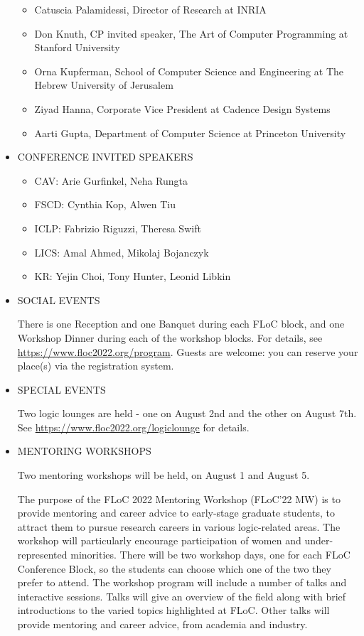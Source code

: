 \documentclass[prodmode,acmtecs]{acmsmall} %
\begin{document}
\begin{itemize}
\begin{itemize}\item  Catuscia Palamidessi, Director of Research at INRIA
\item  Don Knuth, CP invited speaker, The Art of Computer Programming at Stanford University
\item  Orna Kupferman, School of Computer Science and Engineering at The Hebrew University of Jerusalem
\item  Ziyad Hanna, Corporate Vice President at Cadence Design Systems
\item  Aarti Gupta, Department of Computer Science at Princeton University
\end{itemize} 
\item  CONFERENCE INVITED SPEAKERS 
 
\begin{itemize}\item  CAV: Arie Gurfinkel, Neha Rungta
\item  FSCD: Cynthia Kop, Alwen Tiu
\item  ICLP: Fabrizio Riguzzi, Theresa Swift
\item  LICS: Amal Ahmed, Mikolaj Bojanczyk
\item  KR: Yejin Choi, Tony Hunter, Leonid Libkin
\end{itemize} 
\item  SOCIAL EVENTS 
 
  There is one Reception and one Banquet during each FLoC block, and one Workshop Dinner during each of the workshop blocks. For details, see \href{https://www.floc2022.org/program}{https://www.floc2022.org/program}. Guests are welcome: you can reserve your place(s) via the registration system. 
 
\item  SPECIAL EVENTS 
 
  Two logic lounges are held - one on August 2nd and the other on August 7th. See \href{https://www.floc2022.org/logiclounge}{https://www.floc2022.org/logiclounge} for details. 
 
\item  MENTORING WORKSHOPS 
 
  Two mentoring workshops will be held, on August 1 and August 5. 
 
  The purpose of the FLoC 2022 Mentoring Workshop (FLoC'22 MW) is to provide mentoring and career advice to early-stage graduate students, to attract them to pursue research careers in various logic-related areas. The workshop will particularly encourage participation of women and under-represented minorities. There will be two workshop days, one for each FLoC Conference Block, so the students can choose which one of the two they prefer to attend. The workshop program will include a number of talks and interactive sessions. Talks will give an overview of the field along with brief introductions to the varied topics highlighted at FLoC. Other talks will provide mentoring and career advice, from academia and industry.  
 

\end{itemize}
\end{document}
